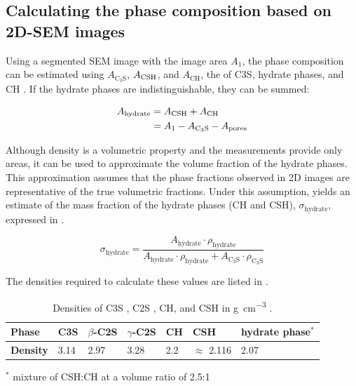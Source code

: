 \FloatBarrier
\subsection{Calculating the phase composition based on 2D-\acs*{SEM} images}

Using a segmented \ac{SEM} image with the image area $A_1$, the phase composition can be estimated using $A_{\text{C}_3\text{S}}$, $A_\text{\text{CSH}}$, and $A_\text{CH}$, the \unit{\areapercent} of \ac{C3S}, hydrate phases, and \ac{CH} \cite{kleiner.2024a}.
If the hydrate phases are indistinguishable, they can be summed:

\begin{equation}
    \label{eq:est_hydrate_area}
    \begin{aligned}
        A_\text{hydrate} &= A_\text{\text{CSH}} + A_\text{CH} \\
        &= A_1 - A_{\text{C}_3\text{S}} - A_{\text{pores}}
    \end{aligned}
\end{equation}

Although density is a volumetric property and the measurements provide only areas, it can be used to approximate the volume fraction of the hydrate phases.
This approximation assumes that the phase fractions observed in 2D images are representative of the true volumetric fractions.
Under this assumption,  yields an estimate of the mass fraction of the hydrate phases (\ac{CH} and \ac{CSH}), \(\sigma_{\text{hydrate}}\), expressed in \unit{\wtpercent}.

\begin{equation}
    \label{eq:est_frac}
    \sigma_\text{hydrate} = \frac{A_\text{hydrate} \cdot \rho_\text{hydrate}}{A_\text{hydrate} \cdot \rho_\text{hydrate} + A_{\text{C}_3\text{S}} \cdot \rho_{\text{C}_3\text{S}}}
\end{equation}

The densities required to calculate these values are listed in .

\begin{table}[htb]
    \centering
    \caption{
        Densities of \ac{C3S} \cite{garrault.2006}, \ac{C2S} \cite{zhang.2012a}, \ac{CH}, and \ac{CSH} \cite{garrault.2006} in \unit{\gram\per\cubic\centi\meter} \cite{jennings.2000,garrault.2006}.}
    \label{tab:densities}
    \begin{tabularx}{\textwidth}{@{}XXXXXXX@{}}
        \toprule
        \textbf{Phase} & \ac{C3S} & $\beta$-\ac{C2S} & $\gamma$-\ac{C2S} & \ac{CH} & \ac{CSH} & hydrate phase$^{*}$\\
		\midrule
        \textbf{Density} & \num{3.14} & \num{2.97} & \num{3.28} & \num{2.2} & $\approx$ \num{2.116} &  \num{2.07} \\
		\bottomrule
    \end{tabularx}
    \par\smallskip\raggedright\footnotesize $^{*}$ mixture of \ac{CSH}:\ac{CH} at a volume ratio of \num{2.5}:\num{1}
\end{table}

